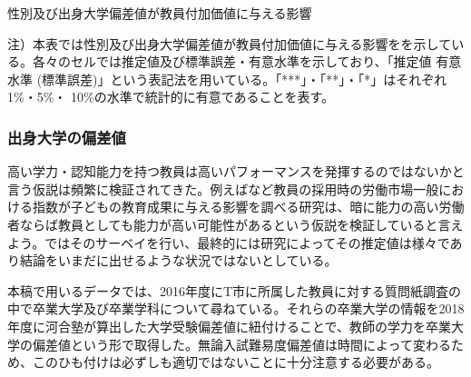 \documentclass[a4paper,12pt]{article}
\begin{document}
\begin{table}[htbp]
\begin{adjustbox}{max width=1\textwidth}

\end{adjustbox}
\caption{性別及び出身大学偏差値が教員付加価値に与える影響}
\label{table:sex}
\begin{flushleft}
\footnotesize{
注）本表では性別及び出身大学偏差値が教員付加価値に与える影響をを示している。各々のセルでは推定値及び標準誤差・有意水準を示しており、「推定値 有意水準 (標準誤差)」という表記法を用いている。「***」・「**」・「*」はそれぞれ1\%・5\%・ 10\%の水準で統計的に有意であることを表す。
}
\end{flushleft}
\end{table}


\subsubsection*{出身大学の偏差値}

高い学力・認知能力を持つ教員は高いパフォーマンスを発揮するのではないかと言う仮説は頻繁に検証されてきた。例えば\cite{二木美苗2017子ども}など教員の採用時の労働市場一般における指数が子どもの教育成果に与える影響を調べる研究は、暗に能力の高い労働者ならば教員としても能力が高い可能性があるという仮説を検証していると言えよう。\cite{hanushek2006teacher}ではそのサーベイを行い、最終的には研究によってその推定値は様々であり結論をいまだに出せるような状況ではないとしている。

本稿で用いるデータでは、2016年度にT市に所属した教員に対する質問紙調査の中で卒業大学及び卒業学科について尋ねている。それらの卒業大学の情報を2018年度に河合塾が算出した大学受験偏差値に紐付けることで、教師の学力を卒業大学の偏差値という形で取得した。無論入試難易度偏差値は時間によって変わるため、このひも付けは必ずしも適切ではないことに十分注意する必要がある。
\end{document}
